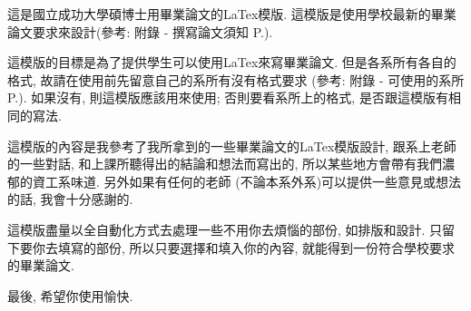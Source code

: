 \StartAbstractChi

這是國立成功大學碩博士用畢業論文的LaTex模版. 這模版是使用學校最新的畢業論文要求來設計(參考: 附錄 - 撰寫論文須知 P.).

這模版的目標是為了提供學生可以使用LaTex來寫畢業論文. 但是各系所有各自的格式, 故請在使用前先留意自己的系所有沒有格式要求 (參考: 附錄 - 可使用的系所 P.). 如果沒有, 則這模版應該用來使用; 否則要看系所上的格式, 是否跟這模版有相同的寫法.

這模版的內容是我參考了我所拿到的一些畢業論文的LaTex模版設計, 跟系上老師的一些對話, 和上課所聽得出的結論和想法而寫出的, 所以某些地方會帶有我們濃郁的資工系味道. 另外如果有任何的老師 (不論本系外系)可以提供一些意見或想法的話, 我會十分感謝的.

這模版盡量以全自動化方式去處理一些不用你去煩惱的部份, 如排版和設計. 只留下要你去填寫的部份, 所以只要選擇和填入你的內容, 就能得到一份符合學校要求的畢業論文.

最後, 希望你使用愉快.

\EndAbstractChi
